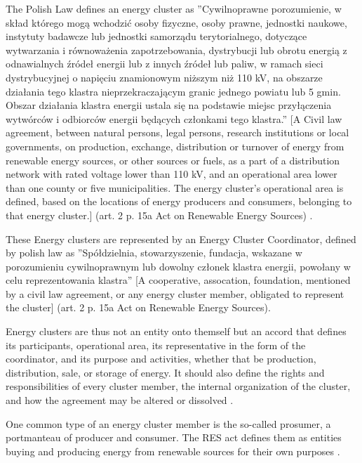 \par The Polish Law defines an energy cluster as ''Cywilnoprawne porozumienie, w skład którego mogą wchodzić osoby fizyczne, osoby prawne, jednostki naukowe, instytuty badawcze lub jednostki samorządu terytorialnego, dotyczące wytwarzania i równoważenia zapotrzebowania, dystrybucji lub obrotu energią z odnawialnych źródeł energii lub z innych źródeł lub paliw, w ramach sieci dystrybucyjnej o napięciu znamionowym niższym niż 110 kV, na obszarze działania tego klastra nieprzekraczającym granic jednego powiatu lub 5 gmin. Obszar działania klastra energii ustala się na podstawie miejsc przyłączenia wytwórców i odbiorców energii będących członkami tego klastra.'' [A Civil law agreement, between natural persons, legal persons, research institutions or local governments, on production, exchange, distribution or turnover of energy from renewable energy sources, or other sources or fuels, as a part of a distribution network with rated voltage lower than 110 kV, and an operational area lower than one county or five municipalities. The energy cluster's operational area is defined, based on the locations of energy producers and consumers, belonging to that energy cluster.]  (art. 2 p. 15a Act on Renewable Energy Sources) \citep{RESAct}.
\par These Energy clusters are represented by an Energy Cluster Coordinator, defined by polish law as ''Spółdzielnia, stowarzyszenie, fundacja, wskazane w porozumieniu cywilnoprawnym lub dowolny członek klastra energii, powołany w celu reprezentowania klastra'' [A cooperative, assocation, foundation, mentioned by a civil law agreement, or any energy cluster member, obligated to represent the cluster] (art. 2 p. 15a Act on Renewable Energy Sources)\citep{RESAct}.
\par Energy clusters are thus not an entity onto themself but an accord that defines its participants, operational area, its representative in the form of the coordinator, and its purpose and activities, whether that be production, distribution, sale, or storage of energy. It should also define the rights and responsibilities of every cluster member, the internal organization of the cluster, and how the agreement may be altered or dissolved \citep{erKlaster}.
\par One common type of an energy cluster member is the so-called prosumer, a portmanteau of producer and consumer. The RES act defines them as entities buying and producing energy from renewable sources for their own purposes \citep{Prosumer} \citep{RESAct}. 


